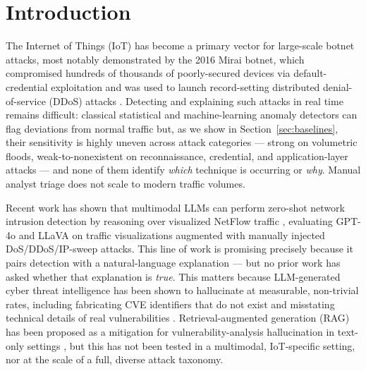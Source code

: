 \documentclass[10pt,twocolumn]{article}
\begin{document}
\begin{abstract}
with no relationship to network flooding as a catch-all justification, a specific hallucination signature not observed in Claude's citations at all. Both LLM harnesses run at $n{=}5$/class; the LLM/baseline sample-size mismatch and the still-limited two-model scope are disclosed as explicit limitations (Section~\ref{sec:discussion}).
\end{abstract}

\section{Introduction}

The Internet of Things (IoT) has become a primary vector for large-scale botnet attacks, most notably demonstrated by the 2016 Mirai botnet, which compromised hundreds of thousands of poorly-secured devices via default-credential exploitation and was used to launch record-setting distributed denial-of-service (DDoS) attacks \cite{antonakakis2017understanding, kolias2017ddos}. Detecting and explaining such attacks in real time remains difficult: classical statistical and machine-learning anomaly detectors \cite{chandola2009anomaly} can flag deviations from normal traffic but, as we show in Section~\ref{sec:baselines}, their sensitivity is highly uneven across attack categories --- strong on volumetric floods, weak-to-nonexistent on reconnaissance, credential, and application-layer attacks --- and none of them identify \emph{which} technique is occurring or \emph{why}. Manual analyst triage does not scale to modern traffic volumes.

Recent work has shown that multimodal LLMs can perform zero-shot network intrusion detection by reasoning over visualized NetFlow traffic \cite{netflowviz}, evaluating GPT-4o and LLaVA on traffic visualizations augmented with manually injected DoS/DDoS/IP-sweep attacks. This line of work is promising precisely because it pairs detection with a natural-language explanation --- but no prior work has asked whether that explanation is \emph{true}. This matters because LLM-generated cyber threat intelligence has been shown to hallucinate at measurable, non-trivial rates, including fabricating CVE identifiers that do not exist and misstating technical details of real vulnerabilities \cite{hallucve}. Retrieval-augmented generation (RAG) has been proposed as a mitigation for vulnerability-analysis hallucination in text-only settings \cite{proverag}, but this has not been tested in a multimodal, IoT-specific setting, nor at the scale of a full, diverse attack taxonomy.
\end{document}
